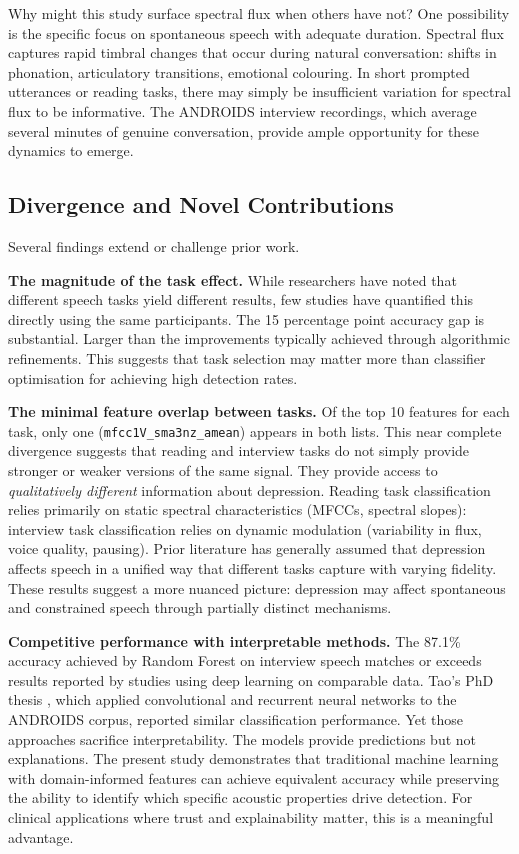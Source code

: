 Why might this study surface spectral flux when others have not? One possibility is the specific focus on spontaneous speech with adequate duration. Spectral flux captures rapid timbral changes that occur during natural conversation: shifts in phonation, articulatory transitions, emotional colouring. In short prompted utterances or reading tasks, there may simply be insufficient variation for spectral flux to be informative. The ANDROIDS interview recordings, which average several minutes of genuine conversation, provide ample opportunity for these dynamics to emerge.

\subsection{Divergence and Novel Contributions}

Several findings extend or challenge prior work.

\textbf{The magnitude of the task effect.} While researchers have noted that different speech tasks yield different results, few studies have quantified this directly using the same participants. The 15 percentage point accuracy gap is substantial. Larger than the improvements typically achieved through algorithmic refinements. This suggests that task selection may matter more than classifier optimisation for achieving high detection rates.

\textbf{The minimal feature overlap between tasks.} Of the top 10 features for each task, only one (\texttt{mfcc1V\_sma3nz\_amean}) appears in both lists. This near complete divergence suggests that reading and interview tasks do not simply provide stronger or weaker versions of the same signal. They provide access to \textit{qualitatively different} information about depression. Reading task classification relies primarily on static spectral characteristics (MFCCs, spectral slopes): interview task classification relies on dynamic modulation (variability in flux, voice quality, pausing). Prior literature has generally assumed that depression affects speech in a unified way that different tasks capture with varying fidelity. These results suggest a more nuanced picture: depression may affect spontaneous and constrained speech through partially distinct mechanisms.

\textbf{Competitive performance with interpretable methods.} The 87.1\% accuracy achieved by Random Forest on interview speech matches or exceeds results reported by studies using deep learning on comparable data. Tao's PhD thesis \cite{tao2020phd}, which applied convolutional and recurrent neural networks to the ANDROIDS corpus, reported similar classification performance. Yet those approaches sacrifice interpretability. The models provide predictions but not explanations. The present study demonstrates that traditional machine learning with domain-informed features can achieve equivalent accuracy while preserving the ability to identify which specific acoustic properties drive detection. For clinical applications where trust and explainability matter, this is a meaningful advantage.

